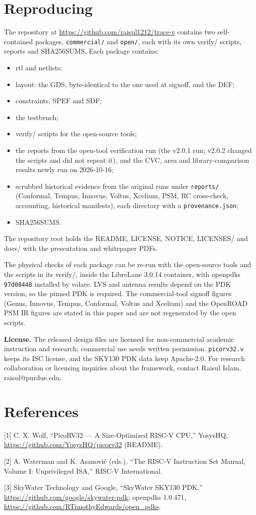 \documentclass[11pt,letterpaper]{article}
\newcommand{\sk}[1]{\texttt{#1}}
\renewcommand{\_}{\textunderscore\penalty0\hskip0pt\relax}
\begin{document}
\section{Reproducing}
The repository at \url{https://github.com/raisul1212/trace-v} contains two self-contained packages, \sk{commercial/} and \sk{open/}, each with its own verify/ scripts, reports and SHA256SUMS. Each package contains:
\begin{itemize}
\item rtl and netlists;
\item layout: the GDS, byte-identical to the one used at signoff, and the DEF;
\item constraints, SPEF and SDF;
\item the testbench;
\item verify/ scripts for the open-source tools;
\item the reports from the open-tool verification run (the v2.0.1 run; v2.0.2 changed the scripts and did not repeat it), and the CVC, area and library-comparison results newly run on 2026-10-16;
\item scrubbed historical evidence from the original runs under \sk{reports/} (Conformal, Tempus, Innovus, Voltus, Xcelium, PSM, RC cross-check, accounting, historical manifests), each directory with a \sk{provenance.json};
\item SHA256SUMS.
\end{itemize}
The repository root holds the README, LICENSE, NOTICE, LICENSES/ and docs/ with the presentation and whitepaper PDFs.

The physical checks of each package can be re-run with the open-source tools and the scripts in its verify/, inside the LibreLane 3.0.14 container, with open\_pdks \sk{97d08448} installed by volare. LVS and antenna results depend on the PDK version, so the pinned PDK is required. The commercial-tool signoff figures (Genus, Innovus, Tempus, Conformal, Voltus and Xcelium) and the OpenROAD PSM IR figures are stated in this paper and are not regenerated by the open scripts.

\textbf{License.} The released design files are licensed for non-commercial academic instruction and research; commercial use needs written permission. \sk{picorv32.v} keeps its ISC license, and the SKY130 PDK data keep Apache-2.0. For research collaboration or licensing inquiries about the framework, contact Raisul Islam, raisul@purdue.edu.

\section*{References}
\raggedright
[1] C. X. Wolf, ``PicoRV32 --- A Size-Optimized RISC-V CPU,'' YosysHQ, \url{https://github.com/YosysHQ/picorv32} (README).

[2] A. Waterman and K. Asanovi\'c (eds.), ``The RISC-V Instruction Set Manual, Volume I: Unprivileged ISA,'' RISC-V International.

[3] SkyWater Technology and Google, ``SkyWater SKY130 PDK,'' \url{https://github.com/google/skywater-pdk}; open\_pdks 1.0.471, \url{https://github.com/RTimothyEdwards/open_pdks}.
\end{document}

